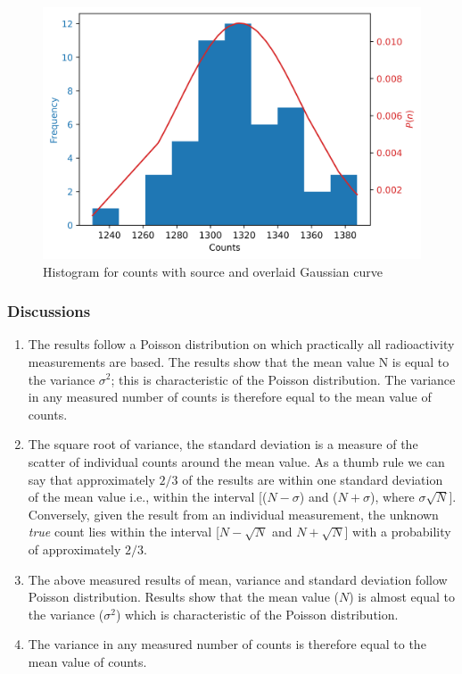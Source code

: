 \documentclass[%
 reprint,
nofootinbib,
 amsmath,amssymb,
 aps,
floatfix,
]{revtex4-2}
\begin{document}
        \begin{figure}
            \centering
            \includegraphics[scale = 0.63]{Figures/plot-ncs-s.png}
            \caption{Histogram for counts with source and overlaid Gaussian curve}
            \label{fig:ncs-s}
        \end{figure}
        \subsubsection{Discussions}
        \begin{enumerate}
            \item The results follow a Poisson distribution on which practically all radioactivity measurements are based. The results show that the mean value N is equal to the variance $\sigma^2$; this is characteristic of the Poisson distribution. The variance in any measured number of counts is therefore equal to the mean value of counts.
            \item The square root of variance, the standard deviation is a measure of the scatter of individual counts around the mean value. As a thumb rule we can say that approximately $2/3$ of the results are within one standard deviation of the mean value i.e., within the interval [($N - \sigma $) and ($N + \sigma$), where $\sigma \sqrt{N}$]. Conversely, given the result from an individual measurement, the unknown \textit{true} count lies within the interval [$N - \sqrt{N}$ and $N + \sqrt{N}$] with a probability of approximately $2/3$.
            \item The above measured results of mean, variance and standard deviation follow Poisson distribution. Results show that the mean value ($N$) is almost equal to the variance ($\sigma^2$) which is characteristic of the Poisson distribution. 
            \item The variance in any measured number of counts is therefore equal to the mean value of counts.
        \end{enumerate}
\end{document}
